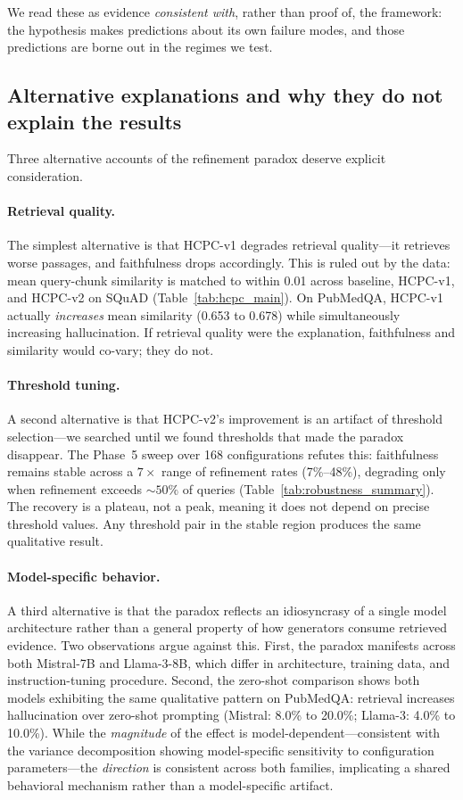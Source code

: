 We read these as evidence \emph{consistent with}, rather than proof of,
the framework: the hypothesis makes predictions about its own failure
modes, and those predictions are borne out in the regimes we test.

\subsection{Alternative explanations and why they do not explain the results}
\label{sec:alternatives}

Three alternative accounts of the refinement paradox deserve explicit
consideration.

\paragraph{Retrieval quality.}
The simplest alternative is that HCPC-v1 degrades retrieval quality---it
retrieves worse passages, and faithfulness drops accordingly. This is
ruled out by the data: mean query-chunk similarity is matched to within
0.01 across baseline, HCPC-v1, and HCPC-v2 on SQuAD
(Table~\ref{tab:hcpc_main}). On PubMedQA, HCPC-v1 actually
\emph{increases} mean similarity (0.653 to 0.678) while simultaneously
increasing hallucination. If retrieval quality were the explanation,
faithfulness and similarity would co-vary; they do not.

\paragraph{Threshold tuning.}
A second alternative is that HCPC-v2's improvement is an artifact of
threshold selection---we searched until we found thresholds that made the
paradox disappear. The Phase~5 sweep over 168 configurations refutes
this: faithfulness remains stable across a $7\times$ range of refinement
rates (7\%--48\%), degrading only when refinement exceeds ${\sim}50\%$
of queries (Table~\ref{tab:robustness_summary}). The recovery is a plateau, not a
peak, meaning it does not depend on precise threshold values. Any
threshold pair in the stable region produces the same qualitative
result.

\paragraph{Model-specific behavior.}
A third alternative is that the paradox reflects an idiosyncrasy of a
single model architecture rather than a general property of how
generators consume retrieved evidence. Two observations argue against
this. First, the paradox manifests across both Mistral-7B and
Llama-3-8B, which differ in architecture, training data, and
instruction-tuning procedure. Second, the zero-shot comparison shows
both models exhibiting the same qualitative pattern on PubMedQA:
retrieval increases hallucination over zero-shot prompting (Mistral:
8.0\% to 20.0\%; Llama-3: 4.0\% to 10.0\%). While the \emph{magnitude}
of the effect is model-dependent---consistent with the variance
decomposition showing model-specific sensitivity to configuration
parameters---the \emph{direction} is consistent across both families,
implicating a shared behavioral mechanism rather than a model-specific
artifact.
